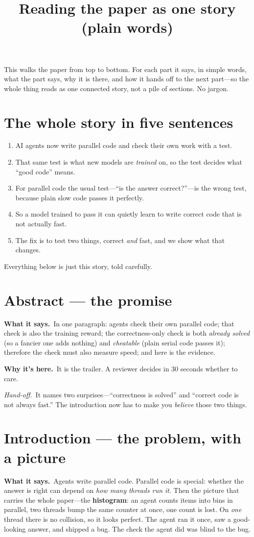 \documentclass[11pt]{article}
\title{\vspace{-2em}Reading the paper as one story\\[-0.3em]
  {\normalsize\normalfont (plain words)}}
\author{}
\date{}
\newcommand{\handoff}[1]{\textit{Hand-off.}\ #1}
\newcommand{\says}[1]{\textbf{What it says.}\ #1}
\newcommand{\why}[1]{\textbf{Why it's here.}\ #1}
\begin{document}
\maketitle
\vspace{-3em}

This walks the paper from top to bottom. For each part it says, in simple words, what the
part says, why it is there, and how it hands off to the next part---so the whole thing
reads as one connected story, not a pile of sections. No jargon.

\section*{The whole story in five sentences}
\begin{enumerate}
\item AI agents now write parallel code and check their own work with a test.
\item That same test is what new models are \emph{trained} on, so the test decides what
  ``good code'' means.
\item For parallel code the usual test---``is the answer correct?''---is the wrong test,
  because plain slow code passes it perfectly.
\item So a model trained to pass it can quietly learn to write correct code that is not
  actually fast.
\item The fix is to test two things, correct \emph{and} fast, and we show what that
  changes.
\end{enumerate}
Everything below is just this story, told carefully.

\section{Abstract --- the promise}
\says{In one paragraph: agents check their own parallel code; that check is also the
training reward; the correctness-only check is both \emph{already solved} (so a fancier
one adds nothing) and \emph{cheatable} (plain serial code passes it); therefore the check
must also measure speed; and here is the evidence.}

\why{It is the trailer. A reviewer decides in 30 seconds whether to care.}

\handoff{It names two surprises---``correctness is solved'' and ``correct code is not
always fast.'' The introduction now has to make you \emph{believe} those two things.}

\section{Introduction --- the problem, with a picture}
\says{Agents write parallel code. Parallel code is special: whether the answer is right
can depend on \emph{how many threads run it}. Then the picture that carries the whole
paper---the \textbf{histogram}: an agent counts items into bins in parallel, two threads
bump the same counter at once, one count is lost. On \emph{one} thread there is no
collision, so it looks perfect. The agent ran it once, saw a good-looking answer, and
shipped a bug. The check the agent did was blind to the bug.}
\end{document}
